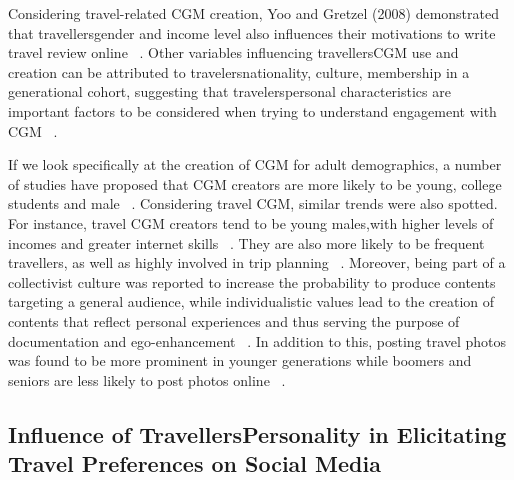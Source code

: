 Considering travel-related CGM creation, Yoo and Gretzel (2008) demonstrated that travellers\textquotesingle  gender and income level also influences their motivations to write travel review online ~\cite{yoo2008motivates}. Other variables influencing travellers\textquotesingle   CGM use and creation can be attributed to travelers\textquotesingle  nationality, culture, membership in a generational cohort, suggesting that travelers\textquotesingle  personal characteristics are important factors to be considered when trying to understand engagement with CGM ~\cite{yoo2011influence}.



If we look specifically at the creation of CGM for adult demographics, a number of studies have proposed that CGM creators are more likely to be young, college students and male ~\cite{yoo2011influence}.
Considering travel CGM, similar trends were also spotted. For instance, travel CGM creators tend to be young males,with higher levels of incomes and greater internet skills ~\cite{yoo2008understanding}. They are also more likely to be frequent travellers, as well as highly involved in trip planning ~\cite{gretzel2008use}. Moreover, being part of a collectivist culture was reported to increase the probability to produce contents targeting a general audience, while individualistic values lead to the creation of contents that reflect personal experiences and thus serving the purpose of documentation and ego-enhancement ~\cite{lee2009social}. In addition to this, posting travel photos was found to be more prominent in younger generations while boomers and seniors are less likely to post photos online ~\cite{yoo2011influence}.

    
\subsection{Influence of Travellers\textquotesingle  Personality in Elicitating Travel Preferences on Social Media}\label{3}



